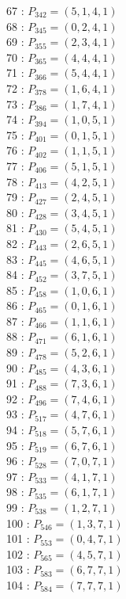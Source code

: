 \documentclass{article}
\begin{document}
{\begin{multicols}{3}
67 : $P_{342}=( 5, 1, 4, 1 )$\\
68 : $P_{345}=( 0, 2, 4, 1 )$\\
69 : $P_{355}=( 2, 3, 4, 1 )$\\
70 : $P_{365}=( 4, 4, 4, 1 )$\\
71 : $P_{366}=( 5, 4, 4, 1 )$\\
72 : $P_{378}=( 1, 6, 4, 1 )$\\
73 : $P_{386}=( 1, 7, 4, 1 )$\\
74 : $P_{394}=( 1, 0, 5, 1 )$\\
75 : $P_{401}=( 0, 1, 5, 1 )$\\
76 : $P_{402}=( 1, 1, 5, 1 )$\\
77 : $P_{406}=( 5, 1, 5, 1 )$\\
78 : $P_{413}=( 4, 2, 5, 1 )$\\
79 : $P_{427}=( 2, 4, 5, 1 )$\\
80 : $P_{428}=( 3, 4, 5, 1 )$\\
81 : $P_{430}=( 5, 4, 5, 1 )$\\
82 : $P_{443}=( 2, 6, 5, 1 )$\\
83 : $P_{445}=( 4, 6, 5, 1 )$\\
84 : $P_{452}=( 3, 7, 5, 1 )$\\
85 : $P_{458}=( 1, 0, 6, 1 )$\\
86 : $P_{465}=( 0, 1, 6, 1 )$\\
87 : $P_{466}=( 1, 1, 6, 1 )$\\
88 : $P_{471}=( 6, 1, 6, 1 )$\\
89 : $P_{478}=( 5, 2, 6, 1 )$\\
90 : $P_{485}=( 4, 3, 6, 1 )$\\
91 : $P_{488}=( 7, 3, 6, 1 )$\\
92 : $P_{496}=( 7, 4, 6, 1 )$\\
93 : $P_{517}=( 4, 7, 6, 1 )$\\
94 : $P_{518}=( 5, 7, 6, 1 )$\\
95 : $P_{519}=( 6, 7, 6, 1 )$\\
96 : $P_{528}=( 7, 0, 7, 1 )$\\
97 : $P_{533}=( 4, 1, 7, 1 )$\\
98 : $P_{535}=( 6, 1, 7, 1 )$\\
99 : $P_{538}=( 1, 2, 7, 1 )$\\
100 : $P_{546}=( 1, 3, 7, 1 )$\\
101 : $P_{553}=( 0, 4, 7, 1 )$\\
102 : $P_{565}=( 4, 5, 7, 1 )$\\
103 : $P_{583}=( 6, 7, 7, 1 )$\\
104 : $P_{584}=( 7, 7, 7, 1 )$\\
\end{multicols}


}
\end{document}
